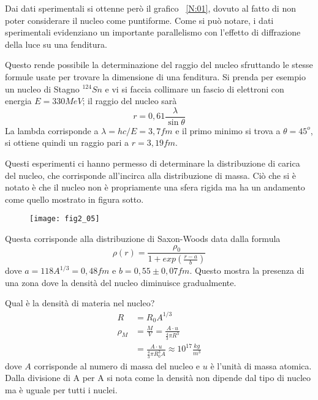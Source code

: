 Dai dati sperimentali si ottenne però il grafico ~\ref{N:01}, dovuto al fatto di non poter considerare il nucleo come puntiforme.
Come si può notare, i dati sperimentali evidenziano un importante parallelismo con l'effetto di diffrazione della luce su una fenditura.

Questo rende possibile la determinazione del raggio del nucleo sfruttando le stesse formule usate per trovare la dimensione di una fenditura.
Si prenda per esempio un nucleo di Stagno $^{124}Sn$ e vi si faccia collimare un fascio di elettroni con energia $E=330MeV$;
il raggio del nucleo sarà
\begin{equation}
r=0,61 \frac{\lambda}{\sin\theta}
\end{equation} 
La lambda corrisponde a $\lambda=hc/E=3,7fm$ e il primo minimo si trova a $\theta=45^o$, si ottiene quindi un raggio pari a $r=3,19fm$.

Questi esperimenti ci hanno permesso di determinare la distribuzione di carica del nucleo, che corrisponde all'incirca alla distribuzione di massa.
Ciò che si è notato è che il nucleo non è propriamente una sfera rigida ma ha un andamento come quello mostrato in figura sotto.
\begin{figure}[h]
\centering
\texttt{[image: fig2\_05]}
\end{figure}
Questa corrisponde alla distribuzione di Saxon-Woods data dalla formula
\begin{equation}
\rho(r)=\frac{\rho_0}{1+exp\left(\frac{r-a}{b}\right)}
\end{equation}
dove $a=118A^{1/3}=0,48fm$ e $b=0,55\pm 0,07fm$.
Questo mostra la presenza di una zona dove la densità del nucleo diminuisce gradualmente.

Qual è la densità di materia nel nucleo?
\begin{equation}
\begin{split}
R&=R_0A^{1/3}\\
\rho_{M}&=\frac{M}{V}=\frac{A\cdot u}{\frac{4}{3}\pi R^3}\\
&=\frac{A\cdot u}{\frac{4}{3}\pi R_0^3A}\approx10^{17}\frac{kg}{m^3}
\end{split}
\end{equation}
dove $A$ corrisponde al numero di massa del nucleo e $u$ è l'unità di massa atomica. 
Dalla divisione di A per A si nota come la densità non dipende dal tipo di nucleo ma è uguale per tutti i nuclei.
